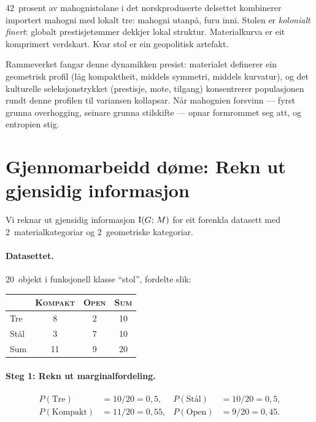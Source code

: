 42~prosent av mahognistolane i det norskproduserte delsettet
kombinerer importert mahogni med lokalt tre: mahogni utanpå, furu
inni. Stolen er \emph{kolonialt finert}: globalt prestisjetømmer
dekkjer lokal struktur. Materialkurva er eit komprimert verdskart.
Kvar stol er ein geopolitisk artefakt.

Rammeverket fangar denne dynamikken presist: materialet definerer
ein geometrisk profil (låg kompaktheit, middels symmetri, middels
kurvatur), og det kulturelle seleksjonstrykket (prestisje, mote,
tilgang) konsentrerer populasjonen rundt denne profilen til
variansen kollapsar. Når mahognien forsvinn --- fyrst grunna
overhogging, seinare grunna stilskifte --- opnar formrommet seg att,
og entropien stig.


\section{Gjennomarbeidd døme: Rekn ut gjensidig informasjon}

Vi reknar ut gjensidig informasjon $\operatorname{I}(G;\, M)$ for eit forenkla
datasett med 2~materialkategoriar og 2~geometriske kategoriar.

\paragraph{Datasettet.}
20~objekt i funksjonell klasse ``stol'', fordelte slik:

\medskip
\begin{center}
\begin{tabular}{@{}lcc|c@{}}
\toprule
& \textsc{Kompakt} & \textsc{Open} & \textsc{Sum} \\
\midrule
Tre & 8 & 2 & 10 \\
Stål & 3 & 7 & 10 \\
\midrule
Sum & 11 & 9 & 20 \\
\bottomrule
\end{tabular}
\end{center}

\paragraph{Steg 1: Rekn ut marginalfordeling.}
\begin{align*}
  P(\text{Tre}) &= 10/20 = 0{,}5, &
  P(\text{Stål}) &= 10/20 = 0{,}5, \\
  P(\text{Kompakt}) &= 11/20 = 0{,}55, &
  P(\text{Open}) &= 9/20 = 0{,}45.
\end{align*}

